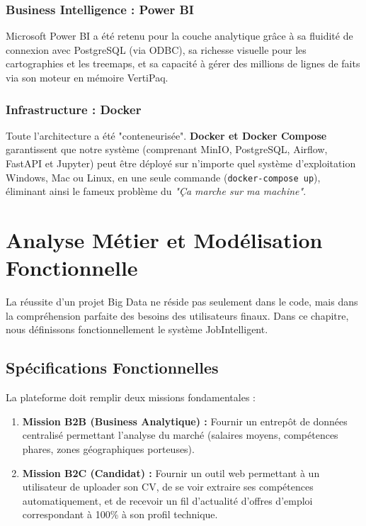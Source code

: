 \documentclass[12pt,a4paper,twoside]{report}
\begin{document}
\subsection{Business Intelligence : Power BI}
Microsoft Power BI a été retenu pour la couche analytique grâce à sa fluidité de connexion avec PostgreSQL (via ODBC), sa richesse visuelle pour les cartographies et les treemaps, et sa capacité à gérer des millions de lignes de faits via son moteur en mémoire VertiPaq.

\subsection{Infrastructure : Docker}
Toute l'architecture a été "conteneurisée". \textbf{Docker et Docker Compose} garantissent que notre système (comprenant MinIO, PostgreSQL, Airflow, FastAPI et Jupyter) peut être déployé sur n'importe quel système d'exploitation Windows, Mac ou Linux, en une seule commande (\texttt{docker-compose up}), éliminant ainsi le fameux problème du \textit{"Ça marche sur ma machine"}.

\chapter{Analyse Métier et Modélisation Fonctionnelle}

La réussite d'un projet Big Data ne réside pas seulement dans le code, mais dans la compréhension parfaite des besoins des utilisateurs finaux. Dans ce chapitre, nous définissons fonctionnellement le système JobIntelligent.

\section{Spécifications Fonctionnelles}
La plateforme doit remplir deux missions fondamentales :
\begin{enumerate}
    \item \textbf{Mission B2B (Business Analytique) :} Fournir un entrepôt de données centralisé permettant l'analyse du marché (salaires moyens, compétences phares, zones géographiques porteuses).
    \item \textbf{Mission B2C (Candidat) :} Fournir un outil web permettant à un utilisateur de uploader son CV, de se voir extraire ses compétences automatiquement, et de recevoir un fil d'actualité d'offres d'emploi correspondant à 100\% à son profil technique.
\end{enumerate}
\end{document}
